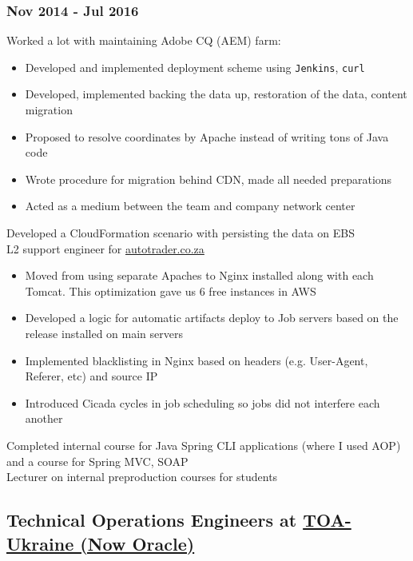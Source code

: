 \documentclass[letterpaper]{article}
\begin{document}
\subsubsection{Nov 2014 - Jul 2016}
\label{sec-2-2-1}
Worked a lot with maintaining Adobe CQ (AEM) farm:
\begin{itemize}
\item Developed and implemented deployment scheme using \verb~Jenkins~, \verb~curl~
\item Developed, implemented backing the data up, restoration of the data, content migration
\item Proposed to resolve coordinates by Apache instead of writing tons of Java code
\item Wrote procedure for migration behind CDN, made all needed preparations
\item Acted as a medium between the team and company network center
\end{itemize}
Developed a CloudFormation scenario with persisting the data on EBS\\
L2 support engineer for \href{http://autotrader.co.za}{autotrader.co.za}
\begin{itemize}
\item Moved from using separate Apaches to Nginx installed along with each Tomcat. This optimization gave us 6 free instances in AWS
\item Developed a logic for automatic artifacts deploy to Job servers based on the release installed on main servers
\item Implemented blacklisting in Nginx based on headers (e.g. User-Agent, Referer, etc) and source IP
\item Introduced Cicada cycles in job scheduling so jobs did not interfere each another
\end{itemize}
Completed internal course for Java Spring CLI applications (where I used AOP) and a course for Spring MVC, SOAP\\
Lecturer on internal preproduction courses for students
\subsection{Technical Operations Engineers at \href{http://toa-ukraine.com}{TOA-Ukraine (Now Oracle)}}
\label{sec-2-3}
\end{document}
